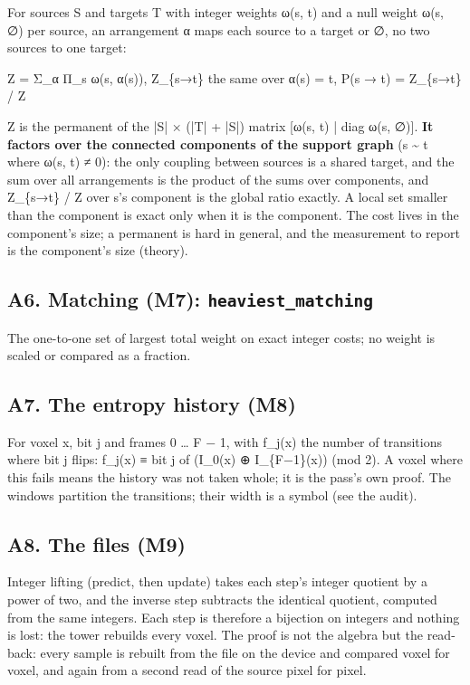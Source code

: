 For sources S and targets T with integer weights ω(s, t) and a null weight ω(s, ∅) per source, an arrangement α maps each source to a target or ∅, no two sources to one target:

Z = Σ\_\allowbreak{}α Π\_\allowbreak{}s ω(s, α(s)),  Z\_\allowbreak{}\{s→t\} the same over α(s) = t,  P(s → t) = Z\_\allowbreak{}\{s→t\} / Z

Z is the permanent of the |S| × (|T| + |S|) matrix [ω(s, t) | diag ω(s, ∅)]. \textbf{It factors over the connected components of the support graph} (s \textasciitilde{} t where ω(s, t) ≠ 0): the only coupling between sources is a shared target, and the sum over all arrangements is the product of the sums over components, and Z\_\allowbreak{}\{s→t\} / Z over s's component is the global ratio exactly. A local set smaller than the component is exact only when it is the component. The cost lives in the component's size; a permanent is hard in general, and the measurement to report is the component's size (theory).

\subsection{\texorpdfstring{A6. Matching (M7): \texttt{heaviest\_\allowbreak{}matching}}{A6. Matching (M7): heaviest\_matching}}

The one-to-one set of largest total weight on exact integer costs; no weight is scaled or compared as a fraction.

\subsection{\texorpdfstring{A7. The entropy history (M8)}{A7. The entropy history (M8)}}

For voxel x, bit j and frames 0 … F − 1, with f\_\allowbreak{}j(x) the number of transitions where bit j flips: f\_\allowbreak{}j(x) ≡ bit j of (I\_\allowbreak{}0(x) ⊕ I\_\allowbreak{}\{F−1\}(x)) (mod 2). A voxel where this fails means the history was not taken whole; it is the pass's own proof. The windows partition the transitions; their width is a symbol (see the audit).

\subsection{\texorpdfstring{A8. The files (M9)}{A8. The files (M9)}}

Integer lifting (predict, then update) takes each step's integer quotient by a power of two, and the inverse step subtracts the identical quotient, computed from the same integers. Each step is therefore a bijection on integers and nothing is lost: the tower rebuilds every voxel. The proof is not the algebra but the read-back: every sample is rebuilt from the file on the device and compared voxel for voxel, and again from a second read of the source pixel for pixel.

